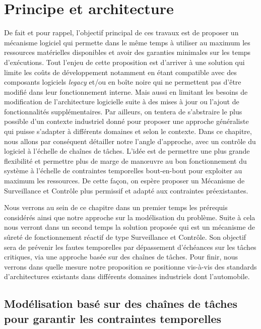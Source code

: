 \documentclass[french, a4paper, 11pt, twoside, pdftex]{StyleThese}
\begin{document}
\setcounter{chapter}{3} %
\dominitoc
\faketableofcontents
\fi

\chapter{Principe et architecture} \label{chap:3_PrincipeArchi}
\minitoc

De fait et pour rappel, l'objectif principal de ces travaux est de proposer un mécanisme logiciel qui permette dans le même temps à utiliser au maximum les ressources matérielles disponibles et avoir des garanties minimales sur les temps d'exécutions. Tout l'enjeu de cette proposition est d'arriver à une solution qui limite les coûts de développement notamment en étant compatible avec des composants logiciels \textit{legacy} et/ou en boîte noire qui ne permettent pas d'être modifié dans leur fonctionnement interne. Mais aussi en limitant les besoins de modification de l'architecture logicielle suite à des mises à jour ou l'ajout de fonctionnalités supplémentaires. Par ailleurs, on tentera de s'abstraire le plus possible d'un contexte industriel donné pour proposer une approche généraliste qui puisse s'adapter à différents domaines et selon le contexte.
Dans ce chapitre, nous allons par conséquent détailler notre l'angle d'approche, avec un contrôle du logiciel à l'échelle de chaînes de tâches. L'idée est de permettre une plus grande flexibilité et permettre plus de marge de manœuvre au bon fonctionnement du système à l'échelle de contraintes temporelles bout-en-bout pour exploiter au maximum les ressources. De cette façon, on espère proposer un Mécanisme de Surveillance et Contrôle plus permissif et adapté aux contraintes préexistantes.

Nous verrons au sein de ce chapitre dans un premier temps les prérequis considérés ainsi que notre approche sur la modélisation du problème. Suite à cela nous verront dans un second temps la solution proposée qui est un mécanisme de sûreté de fonctionnement réactif de type Surveillance et Contrôle. Son objectif sera de prévenir les fautes temporelles par dépassement d'échéances sur les tâches critiques, via une approche basée sur des chaînes de tâches.
Pour finir, nous verrons dans quelle mesure notre proposition se positionne vis-à-vis des standards d'architectures existants dans différents domaines industriels dont l'automobile.



\section[Modèle basé sur des chaînes de tâches]{Modélisation basé sur des chaînes de tâches pour \mbox{garantir} les contraintes temporelles}
\end{document}
